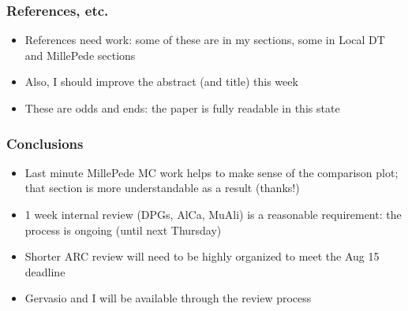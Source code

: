 \documentclass[compress]{beamer}
\begin{document}
\begin{frame}
\frametitle{References, etc.}

\begin{center}  \end{center}

\begin{itemize}
\item References need work: some of these are in my sections, some in Local DT and MillePede sections
\item Also, I should improve the abstract (and title) this week
\item These are odds and ends: the paper is fully readable in this state
\end{itemize}
\end{frame}


\begin{frame}
\frametitle{Conclusions}

\begin{itemize}\setlength{\itemsep}{0.25 cm}
\item Last minute MillePede MC work helps to make sense of the comparison plot; that section is more understandable as a result (thanks!)
\item 1 week internal review (DPGs, AlCa, MuAli) is a reasonable requirement: the process is ongoing (until next Thursday)
\item Shorter ARC review will need to be highly organized to meet the Aug 15 deadline
\item Gervasio and I will be available through the review process
\end{itemize}

\label{numpages}
\end{frame}
\end{document}
